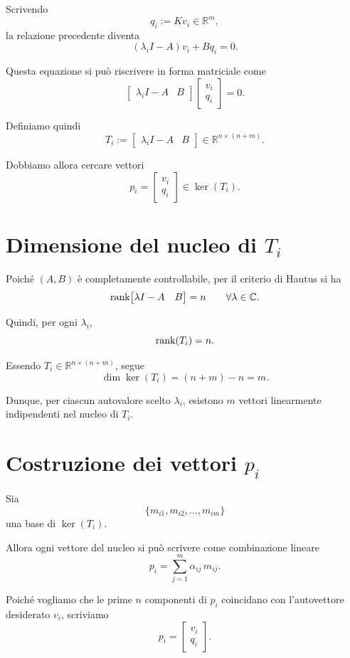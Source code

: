 Scrivendo
\[
q_i:=Kv_i\in\mathbb{R}^m,
\]
la relazione precedente diventa
\[
(\lambda_i I-A)v_i+Bq_i=0.
\]

Questa equazione si può riscrivere in forma matriciale come
\[
\begin{bmatrix}
\lambda_i I-A & B
\end{bmatrix}
\begin{bmatrix}
v_i\\
q_i
\end{bmatrix}
=0.
\]

Definiamo quindi
\[
T_i:=
\begin{bmatrix}
\lambda_i I-A & B
\end{bmatrix}
\in\mathbb{R}^{n\times (n+m)}.
\]

Dobbiamo allora cercare vettori
\[
p_i=
\begin{bmatrix}
v_i\\
q_i
\end{bmatrix}
\in \ker(T_i).
\]

\section{Dimensione del nucleo di \(T_i\)}

Poiché \((A,B)\) è completamente controllabile, per il criterio di Hautus si ha
\[
\rank\!\begin{bmatrix}
\lambda I-A & B
\end{bmatrix}=n
\qquad
\forall \lambda\in\mathbb{C}.
\]

Quindi, per ogni \(\lambda_i\),
\[
\rank(T_i)=n.
\]

Essendo \(T_i\in\mathbb{R}^{n\times (n+m)}\), segue
\[
\dim\ker(T_i)=(n+m)-n=m.
\]

Dunque, per ciascun autovalore scelto \(\lambda_i\),
esistono \(m\) vettori linearmente indipendenti nel nucleo di \(T_i\).

\section{Costruzione dei vettori \(p_i\)}

Sia
\[
\{m_{i1},m_{i2},\dots,m_{im}\}
\]
una base di \(\ker(T_i)\).

Allora ogni vettore del nucleo si può scrivere come combinazione lineare
\[
p_i=\sum_{j=1}^{m}\alpha_{ij}\,m_{ij}.
\]

Poiché vogliamo che le prime \(n\) componenti di \(p_i\) coincidano con l'autovettore desiderato \(v_i\),
scriviamo
\[
p_i=
\begin{bmatrix}
v_i\\
q_i
\end{bmatrix}.
\]

